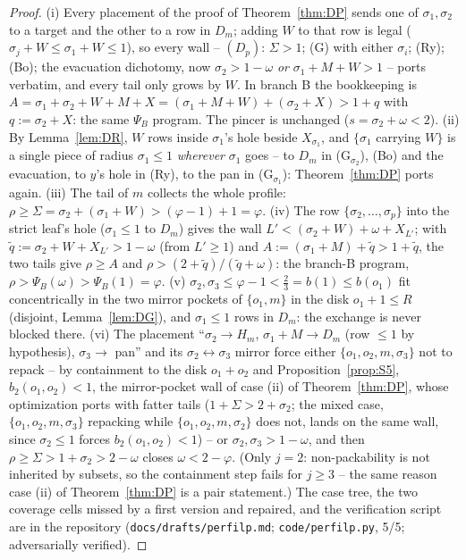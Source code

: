 \documentclass[11pt]{article}
\theoremstyle{definition}
\begin{document}
\begin{proof}
(i) Every placement of the proof of Theorem~\ref{thm:DP} sends one of
$\sigma_1,\sigma_2$ to a target and the other to a row in $D_m$; adding
$W$ to that row is legal ($\sigma_j+W\le\sigma_1+W\le1$), so every wall
-- $(D_p)$: $\Sigma>1$; (G) with either $\sigma_i$; (Ry); (Bo); the
evacuation dichotomy, now $\sigma_2>1-\omega$ \emph{or}
$\sigma_1+M+W>1$ -- ports verbatim, and every tail only grows by $W$.
In branch B the bookkeeping is
$A=\sigma_1+\sigma_2+W+M+X=(\sigma_1+M+W)+(\sigma_2+X)>1+q$ with
$q:=\sigma_2+X$: the same $\Psi_B$ program. The pincer is unchanged
($s=\sigma_2+\omega<2$).
(ii) By Lemma~\ref{lem:DR}, $W$ rows inside $\sigma_1$'s hole beside
$X_{\sigma_1}$, and $\{\sigma_1$ carrying $W\}$ is a single piece of
radius $\sigma_1\le1$ \emph{wherever} $\sigma_1$ goes -- to $D_m$ in
(G$_{\sigma_2}$), (Bo) and the evacuation, to $y$'s hole in (Ry), to
the pan in (G$_{\sigma_1}$): Theorem~\ref{thm:DP} ports again.
(iii) The tail of $m$ collects the whole profile:
$\rho\ge\Sigma=\sigma_2+(\sigma_1+W)>(\varphi-1)+1=\varphi$.
(iv) The row $\{\sigma_2,\dots,\sigma_p\}$ into the strict leaf's hole
($\sigma_1\le1$ to $D_m$) gives the wall
$L'<(\sigma_2+W)+\omega+X_{L'}$; with
$\tilde q:=\sigma_2+W+X_{L'}>1-\omega$ (from $L'\ge1$) and
$A:=(\sigma_1+M)+\tilde q>1+\tilde q$, the two tails give $\rho\ge A$
and $\rho>(2+\tilde q)/(\tilde q+\omega)$: the branch-B program,
$\rho>\Psi_B(\omega)>\Psi_B(1)=\varphi$.
(v) $\sigma_2,\sigma_3\le\varphi-1<\tfrac23=b(1)\le b(o_1)$ fit
concentrically in the two mirror pockets of $\{o_1,m\}$ in the disk
$o_1+1\le R$ (disjoint, Lemma~\ref{lem:DG}), and $\sigma_1\le1$ rows in
$D_m$: the exchange is never blocked there.
(vi) The placement ``$\sigma_2\to H_m$, $\sigma_1{+}M\to D_m$ (row
$\le1$ by hypothesis), $\sigma_3\to$ pan'' and its
$\sigma_2\leftrightarrow\sigma_3$ mirror force either
$\{o_1,o_2,m,\sigma_3\}$ not to repack -- by containment to the disk
$o_1+o_2$ and Proposition~\ref{prop:S5}, $b_2(o_1,o_2)<1$, the
mirror-pocket wall of case (ii) of Theorem~\ref{thm:DP}, whose
optimization ports with fatter tails ($1+\Sigma>2+\sigma_2$; the mixed
case, $\{o_1,o_2,m,\sigma_3\}$ repacking while $\{o_1,o_2,m,\sigma_2\}$
does not, lands on the same wall, since $\sigma_2\le1$ forces
$b_2(o_1,o_2)<1$) -- or
$\sigma_2,\sigma_3>1-\omega$, and then
$\rho\ge\Sigma>1+\sigma_2>2-\omega$ closes $\omega<2-\varphi$. (Only
$j=2$: non-packability is not inherited by subsets, so the containment
step fails for $j\ge3$ -- the same reason case (ii) of
Theorem~\ref{thm:DP} is a pair statement.) The case tree, the two
coverage cells missed by a first version and repaired, and the
verification script are in the repository
(\texttt{docs/drafts/perfilp.md}; \texttt{code/perfilp.py}, 5/5;
adversarially verified).
\end{proof}
\end{document}

